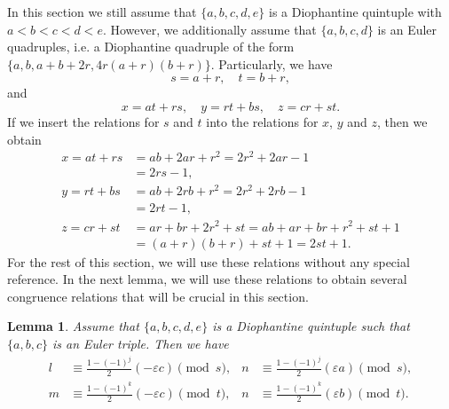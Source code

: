 \documentclass{amsart}
\newtheorem{lemma}{Lemma}
\theoremstyle{definition}
\begin{document}
In this section we still assume that $\{a,b,c,d,e\}$ is a Diophantine quintuple with $a<b<c<d<e$. However, we additionally assume that $\{a,b,c,d\}$ is an Euler quadruples, i.e. a Diophantine quadruple of the form $\{a,b, a+b+2r, 4r(a+r)(b+r)\}$. Particularly, we have 
$$s=a+r,\quad  t=b+r,$$ 
and 
$$x=at+rs,\quad y=rt+bs,\quad z=cr+st.$$
If we insert the relations for $s$ and $t$ into the relations for $x$, $y$ and $z$, then we obtain
\begin{align*}
 x=at+rs&=ab+2ar+r^2=2r^2+2ar-1\\
 &=2rs-1,\\
 y=rt+bs&=ab+2rb+r^2=2r^2+2rb-1\\
 &=2rt-1,\\
 z=cr+st&=ar+br+2r^2+st=ab+ar+br+r^2+st+1\\
 &=(a+r)(b+r)+st+1=2st+1.
\end{align*}
For the rest of this section, we will use these relations without any special reference. In the next lemma, we will use
these relations to obtain several congruence relations that will be crucial in this section.

\begin{lemma}\label{lem:lmn2}
Assume that $\{a,b,c,d,e\}$ is a Diophantine quintuple such that $\{a,b,c\}$ is an Euler triple. Then we have 
\begin{align*}
l &\equiv \frac{1-(-1)^j}{2} (-\varepsilon c) \pmod{s},& n &\equiv \frac{1-(-1)^j}{2} (\varepsilon a) \pmod{s},\\
m &\equiv \frac{1-(-1)^k}{2} (-\varepsilon c) \pmod{t},& n &\equiv \frac{1-(-1)^k}{2} (\varepsilon b) \pmod{t}.
\end{align*}
\end{lemma}
\end{document}
